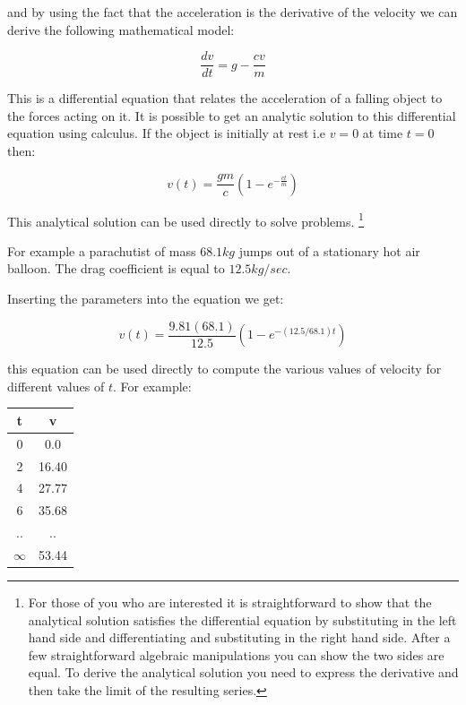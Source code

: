 \documentclass [titlepage,12pt,letter] {article}
\begin{document}
\noindent and by using the fact that the acceleration is the
derivative of the velocity we can derive the following mathematical
model: 

\begin{equation} 
\frac{dv}{dt} = g - \frac{cv}{m} 
\end{equation} 

\noindent 
This is a differential equation that relates the acceleration of a
falling object to the forces acting on it. It is possible to get an
analytic solution to this differential equation using calculus. If the 
object is initially at rest i.e $v = 0$ at time $t = 0$ then: 

\begin{equation} 
v(t) = \frac{gm}{c} (1 - e^{-\frac{ct}{m}})
\end{equation} 


This analytical solution can be used directly to solve
problems. \footnote{For those of you who are interested it is
  straightforward to show that the analytical solution satisfies the
  differential equation by substituting in the left hand side and
  differentiating and substituting in the right hand side. After a few
straightforward algebraic manipulations you can show the two sides are
equal. To derive the analytical solution you need to express the
derivative and then take the limit of the resulting series.} 


For
example a parachutist of mass $68.1 kg$ jumps out of a stationary hot
air balloon. The drag coefficient is equal to $12.5 kg/sec$. 

Inserting the parameters into the equation we get: 

\begin{equation} 
v(t) = \frac{9.81 (68.1)}{12.5} (1 - e^{-(12.5/68.1)t}) 
\end{equation} 

\noindent 
this equation can be used directly to compute the various values of
velocity for different values of $t$. For example: 

\begin{table}
\centering
\begin{tabular}{|c|c|} 
\hline
{\bf t}    & {\bf v} \\ 
\hline 
0   &  0.0 \\ 
2   &  16.40 \\ 
4   &  27.77 \\ 
6   &  35.68  \\
..   &  ..  \\
$\infty$ & 53.44 \\  
\hline
\end{tabular}
\end{table} 
  
\end{document}
